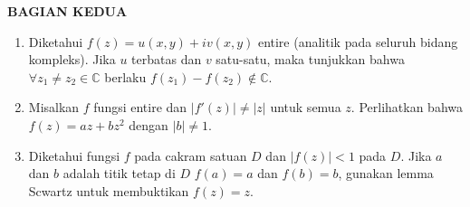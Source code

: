 \documentclass[12pt,twoside]{article}
\begin{document}
\newpage \textbf{BAGIAN KEDUA}
\begin{enumerate}
	\item Diketahui $f(z)=u(x,y)+iv(x,y)$ entire (analitik pada seluruh bidang kompleks). Jika $u$ terbatas dan $v$ satu-satu, maka tunjukkan bahwa $\forall z_1\neq z_2\in \mathbb{C}$ berlaku $f(z_1)-f(z_2)\notin \mathbb{C}$.

	\item Misalkan $f$ fungsi entire dan $|f'(z)|\neq |z|$ untuk semua $z$. Perlihatkan bahwa $f(z)=az+bz^2$ dengan $|b|\neq 1$.

	\item Diketahui fungsi $f$ pada cakram satuan $D$ dan $|f(z)|<1$ pada $D$. Jika $a$ dan $b$ adalah titik tetap di $D$ $f(a)=a$ dan $f(b)=b$, gunakan lemma Scwartz untuk membuktikan $f(z)=z$.
\end{enumerate}
\end{document}
